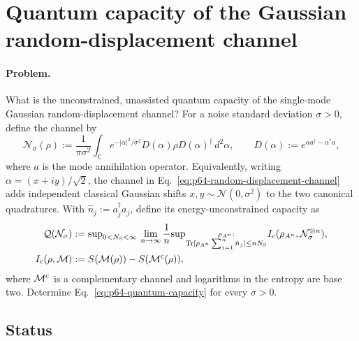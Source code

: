 \section{Quantum capacity of the Gaussian random-displacement channel}
\label{sec:op_1e7f431ed9013d1e}

\paragraph{Problem.}
What is the unconstrained, unassisted quantum capacity of the single-mode
Gaussian random-displacement channel?  For a noise standard deviation
$\sigma>0$, define the channel by
\begin{equation}
  \mathcal N_\sigma(\rho)
  :=\frac{1}{\pi\sigma^2}\int_{\mathbb C}
       e^{-\lvert\alpha\rvert^2/\sigma^2}
       D(\alpha)\rho D(\alpha)^\dagger\,d^2\alpha,
  \qquad
  D(\alpha):=e^{\alpha a^\dagger-\alpha^*a},
  \label{eq:p64-random-displacement-channel}
\end{equation}
where $a$ is the mode annihilation operator.  Equivalently, writing
$\alpha=(x+iy)/\sqrt2$, the channel in
Eq.~\eqref{eq:p64-random-displacement-channel} adds independent classical
Gaussian shifts $x,y\sim\mathcal N(0,\sigma^2)$ to the two canonical
quadratures.  With $\hat n_j:=a_j^\dagger a_j$, define its
energy-unconstrained capacity as
\begin{equation}
  \begin{aligned}
  \mathcal Q(\mathcal N_\sigma)
  &:={\sup}_{0<N_{\rm S}<\infty}\,
     \lim_{n\to\infty}\frac1n
     {\sup}_{\substack{\rho_{A^n}:\\
       \operatorname{Tr}[\rho_{A^n}\sum_{j=1}^n\hat n_j]
       \leq nN_{\rm S}}}
       I_{\rm c}(\rho_{A^n},\mathcal N_\sigma^{\otimes n}),\\
  I_{\rm c}(\rho,\mathcal M)
  &:=S(\mathcal M(\rho))-S(\mathcal M^{\rm c}(\rho)),
  \end{aligned}
  \label{eq:p64-quantum-capacity}
\end{equation}
where $\mathcal M^{\rm c}$ is a complementary channel and logarithms in the
entropy are base two.  Determine Eq.~\eqref{eq:p64-quantum-capacity} for every
$\sigma>0$.

\subsection*{Status}

